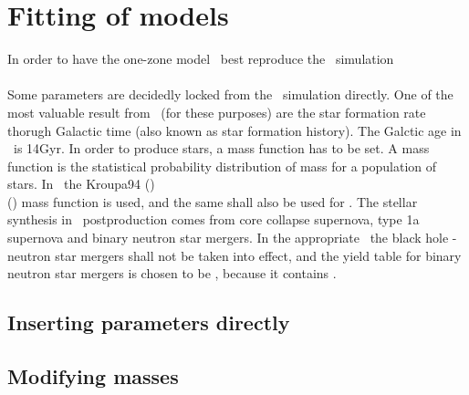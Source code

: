 \section{Fitting of models}

\newcommand\thesisfolder{/home/oyvind/github\_uio/Master/latex/thesis/}

In order to have the one-zone model \omegamodel\ best reproduce the \eris\ simulation \\
 \\
Some parameters are decidedly locked from the \eris\ simulation directly.
One of the most valuable result from \eris\ (for these purposes)
are the star formation rate thorugh Galactic time (also known as star formation history). The Galctic age in \eris\, is 14Gyr.
In order to produce stars, a mass function has to be set. A mass function is the statistical probability distribution of mass for a population of stars. In \eris\ the Kroupa94
()\\
()
mass function is used, and the same shall also be used for \omegamodel. 
The stellar synthesis in \eris\ postproduction comes from core collapse supernova, type 1a supernova and binary neutron star mergers.
In the appropriate \omegamodel\ the black hole - neutron star mergers shall not be taken into effect,
and the yield table for binary neutron star mergers is chosen to be  , because it contains .


\iffalse %
\begin{figure}
  \centering
  \texttt{[image: ../results/plots\_fitting/sfr\_set\_eris\_param.png]}
  \caption{\label{img:fitting-set-eris-sfr}\comment{Add comments and update figure}}
\end{figure}
\fi %

\subsection{Inserting parameters directly}
\subsection{Modifying masses}
